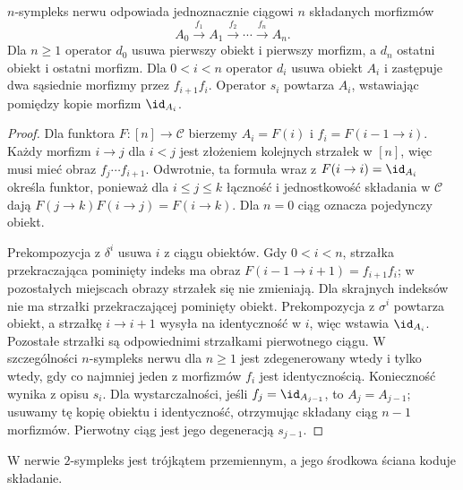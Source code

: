 \begin{stwierdzenie}\label{cat:prop:nerve-strings}
$n$-sympleks nerwu odpowiada jednoznacznie ciągowi $n$ składanych morfizmów
\[
 A_0\xrightarrow{f_1}A_1\xrightarrow{f_2}\cdots
 \xrightarrow{f_n}A_n.
\]
Dla $n\geq1$ operator $d_0$ usuwa pierwszy obiekt i pierwszy morfizm, a $d_n$ ostatni obiekt i ostatni morfizm. Dla $0<i<n$ operator $d_i$ usuwa obiekt $A_i$ i zastępuje dwa sąsiednie morfizmy przez $f_{i+1}f_i$. Operator $s_i$ powtarza $A_i$, wstawiając pomiędzy kopie morfizm $\id_{A_i}$.
\end{stwierdzenie}
\begin{proof}
Dla funktora $F:[n]\to\mathcal C$ bierzemy $A_i=F(i)$ i $f_i=F(i-1\to i)$. Każdy morfizm $i\to j$ dla $i<j$ jest złożeniem kolejnych strzałek w $[n]$, więc musi mieć obraz $f_j\cdots f_{i+1}$. Odwrotnie, ta formuła wraz z $F(i\to i)=\id_{A_i}$ określa funktor, ponieważ dla $i\leq j\leq k$ łączność i jednostkowość składania w $\mathcal C$ dają $F(j\to k)F(i\to j)=F(i\to k)$. Dla $n=0$ ciąg oznacza pojedynczy obiekt.

Prekompozycja z $\delta^i$ usuwa $i$ z ciągu obiektów. Gdy $0<i<n$, strzałka przekraczająca pominięty indeks ma obraz $F(i-1\to i+1)=f_{i+1}f_i$; w pozostałych miejscach obrazy strzałek się nie zmieniają. Dla skrajnych indeksów nie ma strzałki przekraczającej pominięty obiekt. Prekompozycja z $\sigma^i$ powtarza obiekt, a strzałkę $i\to i+1$ wysyła na identyczność w $i$, więc wstawia $\id_{A_i}$. Pozostałe strzałki są odpowiednimi strzałkami pierwotnego ciągu. W szczególności $n$-sympleks nerwu dla $n\geq1$ jest zdegenerowany wtedy i tylko wtedy, gdy co najmniej jeden z morfizmów $f_i$ jest identycznością. Konieczność wynika z opisu $s_i$. Dla wystarczalności, jeśli $f_j=\id_{A_{j-1}}$, to $A_j=A_{j-1}$; usuwamy tę kopię obiektu i identyczność, otrzymując składany ciąg $n-1$ morfizmów. Pierwotny ciąg jest jego degeneracją $s_{j-1}$.
\end{proof}

\begin{center}
\end{center}
W nerwie $2$-sympleks jest trójkątem przemiennym, a jego środkowa ściana koduje składanie.

